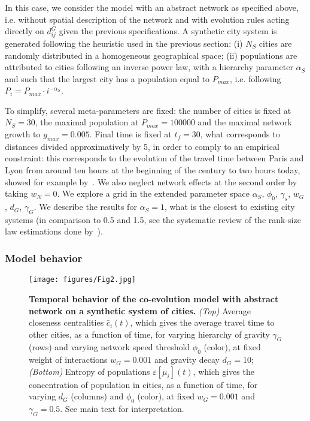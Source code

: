 \documentclass[11pt]{article}
\begin{document}
In this case, we consider the model with an abstract network as specified above, i.e. without spatial description of the network and with evolution rules acting directly on $d^G_{ij}$ given the previous specifications. A synthetic city system is generated following the heuristic used in the previous section: (i) $N_S$ cities are randomly distributed in a homogeneous geographical space; (ii) populations are attributed to cities following an inverse power law, with a hierarchy parameter $\alpha_S$ and such that the largest city has a population equal to $P_{max}$, i.e. following $P_i = P_{max} \cdot i^{-\alpha_S}$.


To simplify, several meta-parameters are fixed: the number of cities is fixed at $N_S = 30$, the maximal population at $P_{max} = 100000$ and the maximal network growth to $g_{max} = 0.005$. Final time is fixed at $t_f = 30$, what corresponds to distances divided approximatively by 5, in order to comply to an empirical constraint: this corresponds to the evolution of the travel time between Paris and Lyon from around ten hours at the beginning of the century to two hours today, showed for example by~\cite{thevenin2013mapping}. We also neglect network effects at the second order by taking $w_N = 0$. We explore a grid in the extended parameter space $\alpha_S$, $\phi_0$, $\gamma_s$, $w_G$, $d_G$, $\gamma_G$. We describe the results for $\alpha_S = 1$, what is the closest to existing city systems (in comparison to 0.5 and 1.5, see the systematic review of the rank-size law estimations done by~\cite{10.1371/journal.pone.0183919}).


\subsubsection{Model behavior}


\begin{figure}
\texttt{[image: figures/Fig2.jpg]}
\caption{\textbf{Temporal behavior of the co-evolution model with abstract network on a synthetic system of cities.} \textit{(Top)} Average closeness centralities $\bar{c}_i(t)$, which gives the average travel time to other cities, as a function of time, for varying hierarchy of gravity $\gamma_G$ (rows) and varying network speed threshold $\phi_0$ (color), at fixed weight of interactions $w_G = 0.001$ and gravity decay $d_G = 10$; \textit{(Bottom)} Entropy of populations $\varepsilon\left[\mu_i \right] (t)$, which gives the concentration of population in cities, as a function of time, for varying $d_G$ (columns) and $\phi_0$ (color), at fixed $w_G = 0.001$ and $\gamma_G = 0.5$. See main text for interpretation.\label{fig:macrocoevol:behavior-time}}
\end{figure}
\end{document}
